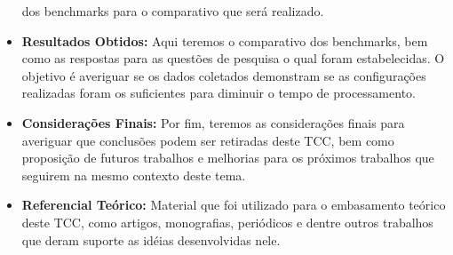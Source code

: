 \begin{itemize}
                                                                                                   dos benchmarks para o comparativo que será realizado.
        \item \textbf{Resultados Obtidos: } Aqui teremos o comparativo dos benchmarks, bem como as respostas para as
                                                                  questões de pesquisa o qual foram estabelecidas. O objetivo é averiguar se os
                                                                  dados coletados demonstram se as configurações realizadas foram os suficientes
                                                                  para diminuir o tempo de processamento.
        \item \textbf{Considerações Finais:} Por fim, teremos as considerações finais para averiguar que conclusões podem ser
                                                                     retiradas deste TCC, bem como proposição de futuros trabalhos e melhorias para os
                                                                     próximos trabalhos que seguirem na mesmo contexto deste tema.
        \item \textbf{Referencial Teórico:} Material que foi utilizado para o embasamento teórico deste TCC, como artigos,
                                                                  monografias, periódicos e dentre outros trabalhos que deram suporte as idéias
                                                                  desenvolvidas nele.
    \end{itemize}